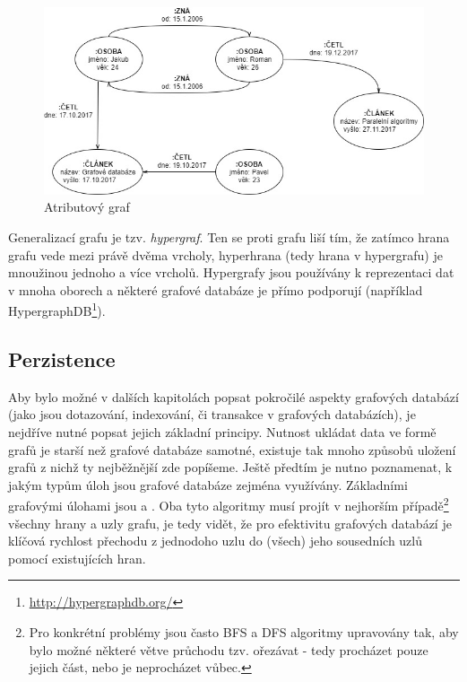 \begin{figure}
\begin{center}
\includegraphics[width=14cm]{figures/property_graph}
\caption{Atributový graf}
\label{fig:property_graf}
\end{center}
\end{figure}

Generalizací grafu je tzv. \textit{hypergraf}. Ten se proti grafu liší tím, že zatímco hrana grafu vede mezi právě dvěma vrcholy, hyperhrana (tedy hrana v hypergrafu) je mnoužinou jednoho a více vrcholů.\cite{Diestel00} Hypergrafy jsou používány k reprezentaci dat v mnoha oborech a některé grafové databáze je přímo podporují (například HypergraphDB\footnote{\url{http://hypergraphdb.org/}}).


\subsection{Perzistence}
\label{sec:persistence}
Aby bylo možné v dalších kapitolách popsat pokročilé aspekty grafových databází (jako jsou dotazování, indexování, či transakce v grafových databázích), je nejdříve nutné popsat jejich základní principy. Nutnost ukládat data ve formě grafů je starší než grafové databáze samotné, existuje tak mnoho způsobů uložení grafů z nichž ty nejběžnější zde popíšeme. Ještě předtím je nutno poznamenat, k jakým typům úloh jsou grafové databáze zejména využívány. Základními grafovými úlohami jsou  a . Oba tyto algoritmy musí projít v nejhorším případě\footnote{Pro konkrétní problémy jsou často BFS a DFS algoritmy upravovány tak, aby bylo možné některé větve průchodu tzv. ořezávat - tedy procházet pouze jejich část, nebo je neprocházet vůbec.} všechny hrany a uzly grafu, je tedy vidět, že pro efektivitu grafových databází je klíčová rychlost přechodu z jednodoho uzlu do (všech) jeho sousedních uzlů pomocí existujících hran.

